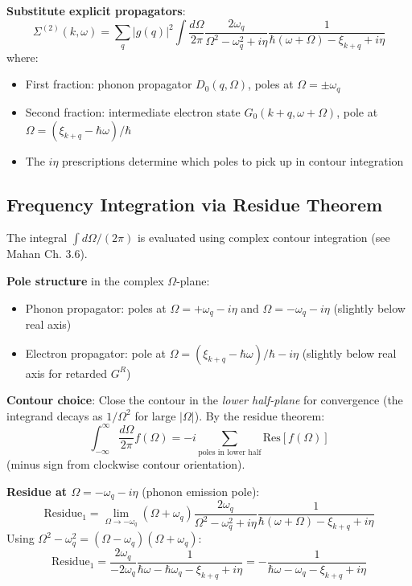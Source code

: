 \documentclass[12pt]{article}
\begin{document}
\textbf{Substitute explicit propagators}:
\begin{equation}
\Sigma^{(2)}(k,\omega) = \sum_q |g(q)|^2 \int \frac{d\Omega}{2\pi} \frac{2\omega_q}{\Omega^2 - \omega_q^2 + i\eta} \frac{1}{\hbar(\omega+\Omega) - \xi_{k+q} + i\eta}
\end{equation}
where:
\begin{itemize}
\item First fraction: phonon propagator $D_0(q,\Omega)$, poles at $\Omega = \pm\omega_q$
\item Second fraction: intermediate electron state $G_0(k+q,\omega+\Omega)$, pole at $\Omega = (\xi_{k+q} - \hbar\omega)/\hbar$
\item The $i\eta$ prescriptions determine which poles to pick up in contour integration
\end{itemize}

\subsection{Frequency Integration via Residue Theorem}

The integral $\int d\Omega/(2\pi)$ is evaluated using complex contour integration (see Mahan Ch. 3.6).

\textbf{Pole structure} in the complex $\Omega$-plane:
\begin{itemize}
\item Phonon propagator: poles at $\Omega = +\omega_q - i\eta$ and $\Omega = -\omega_q - i\eta$ (slightly below real axis)
\item Electron propagator: pole at $\Omega = (\xi_{k+q} - \hbar\omega)/\hbar - i\eta$ (slightly below real axis for retarded $G^R$)
\end{itemize}

\textbf{Contour choice}: Close the contour in the \textit{lower half-plane} for convergence (the integrand decays as $1/\Omega^2$ for large $|\Omega|$). By the residue theorem:
\begin{equation}
\int_{-\infty}^{\infty} \frac{d\Omega}{2\pi} f(\Omega) = -i \sum_{\text{poles in lower half}} \text{Res}[f(\Omega)]
\end{equation}
(minus sign from clockwise contour orientation).

\textbf{Residue at $\Omega = -\omega_q - i\eta$} (phonon emission pole):
\begin{equation}
\text{Residue}_1 = \lim_{\Omega \to -\omega_q} (\Omega + \omega_q) \frac{2\omega_q}{\Omega^2 - \omega_q^2 + i\eta} \frac{1}{\hbar(\omega+\Omega) - \xi_{k+q} + i\eta}
\end{equation}
Using $\Omega^2 - \omega_q^2 = (\Omega - \omega_q)(\Omega + \omega_q)$:
\begin{equation}
\text{Residue}_1 = \frac{2\omega_q}{-2\omega_q} \frac{1}{\hbar\omega - \hbar\omega_q - \xi_{k+q} + i\eta} = -\frac{1}{\hbar\omega - \omega_q - \xi_{k+q} + i\eta}
\end{equation}
\end{document}
